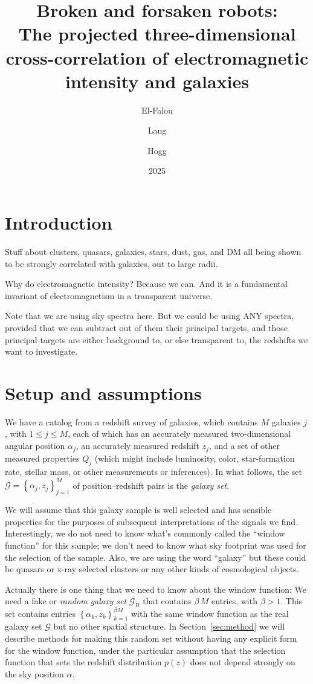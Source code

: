 \documentclass{article}
\title{\bfseries%
Broken and forsaken robots:\\
The projected three-dimensional cross-correlation of electromagnetic intensity and galaxies}
\author{El-Falou \and Lang \and Hogg}
\date{2025}
\newcommand{\sectionname}{Section}
\newcommand{\secref}[1]{\sectionname~\ref{#1}}
\newcommand{\setof}[1]{\left\{{#1}\right\}}
\newcommand{\set}[1]{\mathscr{#1}}
\begin{document}
\maketitle

\section{Introduction}\label{sec:intro}
Stuff about clusters, quasars, galaxies, stars, dust, gas, and DM all being shown to be strongly correlated with galaxies, out to large radii.

Why do electromagnetic intensity? Because we can. And it is a fundamental invariant of electromagnetism in a transparent universe.

Note that we are using sky spectra here. But we could be using ANY spectra, provided that we can subtract out of them their principal targets, and those principal targets are either background to, or else transparent to, the redshifts we want to investigate.

\section{Setup and assumptions}\label{sec:setup}
We have a catalog from a redshift survey of galaxies, which contains $M$ galaxies $j$, with $1\leq j\leq M$, each of which has an accurately measured two-dimensional angular position $\alpha_j$, an accurately measured redshift $z_j$, and a set of other measured properties $Q_j$ (which might include luminosity, color, star-formation rate, stellar mass, or other measurements or inferences).
In what follows, the set $\set{G}=\setof{\alpha_j, z_j}_{j=1}^M$ of position--redshift pairs is the \emph{galaxy set}.

We will assume that this galaxy sample is well selected and has sensible properties for the purposes of subsequent interpretations of the signals we find.
Interestingly, we do not need to know what's commonly called the ``window function'' for this sample; we don't need to know what sky footprint was used for the selection of the sample.
Also, we are using the word ``galaxy'' but these could be quasars or x-ray selected clusters or any other kinds of cosmological objects.

Actually there is one thing that we need to know about the window function:
We need a fake or \emph{random galaxy set} $\set{G}_R$ that contains $\beta\,M$ entries, with $\beta>1$.
This set contains entries $\setof{\alpha_k,z_k}_{k=1}^{\beta M}$ with the same window function as the real galaxy set $\set{G}$ but no other spatial structure.
In \secref{sec:method} we will describe methods for making this random set without having any explicit form for the window function, under the particular assumption that the selection function that sets the redshift distribution $p(z)$ does not depend strongly on the sky position $\alpha$.
\end{document}
